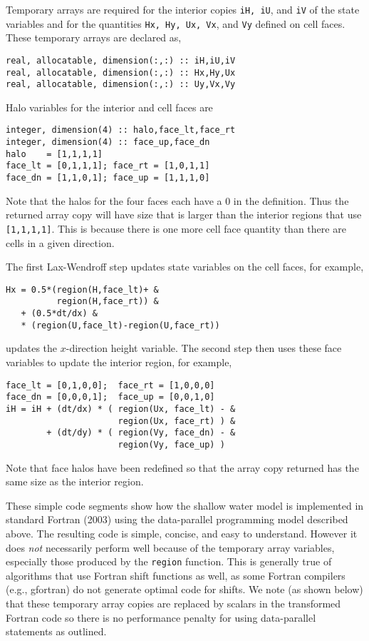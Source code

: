 Temporary arrays are required for the interior copies {\tt iH, iU}, and
{\tt iV} of the state variables and for the quantities {\tt Hx, Hy, Ux,
Vx}, and {\tt Vy} defined on cell faces.  These temporary arrays are declared as,

{\small
\begin{verbatim}
real, allocatable, dimension(:,:) :: iH,iU,iV
real, allocatable, dimension(:,:) :: Hx,Hy,Ux
real, allocatable, dimension(:,:) :: Uy,Vx,Vy
\end{verbatim}
}

Halo variables for the interior and cell faces are

{\small
\begin{verbatim}
integer, dimension(4) :: halo,face_lt,face_rt
integer, dimension(4) :: face_up,face_dn
halo    = [1,1,1,1]
face_lt = [0,1,1,1]; face_rt = [1,0,1,1]
face_dn = [1,1,0,1]; face_up = [1,1,1,0]
\end{verbatim}
}

\noindent
Note that the halos for the four faces each have a 0 in the
definition. Thus the returned array copy will have size that is larger
than the interior regions that use {\tt [1,1,1,1]}.  This is because
there is one more cell face quantity than there are cells in a given
direction.

The first Lax-Wendroff step updates state variables on the cell
faces, for example,

{\small
\begin{verbatim}
Hx = 0.5*(region(H,face_lt)+ &
          region(H,face_rt)) &
   + (0.5*dt/dx) &
   * (region(U,face_lt)-region(U,face_rt))
\end{verbatim}
}

\noindent
updates the $x$-direction height variable.  The second step then uses
these face variables to update the interior region, for example,

{\small
\begin{verbatim}
face_lt = [0,1,0,0];  face_rt = [1,0,0,0]
face_dn = [0,0,0,1];  face_up = [0,0,1,0]
iH = iH + (dt/dx) * ( region(Ux, face_lt) - &
                      region(Ux, face_rt) ) &
        + (dt/dy) * ( region(Vy, face_dn) - &
                      region(Vy, face_up) )
\end{verbatim}
}

\noindent
Note that face halos have been redefined so that the array copy
returned has the same size as the interior region.

These simple code segments show how the shallow water model is
implemented in standard Fortran (2003) using the data-parallel
programming model described above.  The resulting code is simple,
concise, and easy to understand.  However it does \emph{not}
necessarily perform well because of the temporary array variables,
especially those produced by the {\tt region} function.  This is
generally true of algorithms that use Fortran shift functions as well,
as some Fortran compilers (e.g., gfortran) do not generate optimal
code for shifts.  We note (as shown below) that these temporary array
copies are replaced by scalars in the transformed Fortran code so
there is no performance penalty for using data-parallel statements as
outlined.
